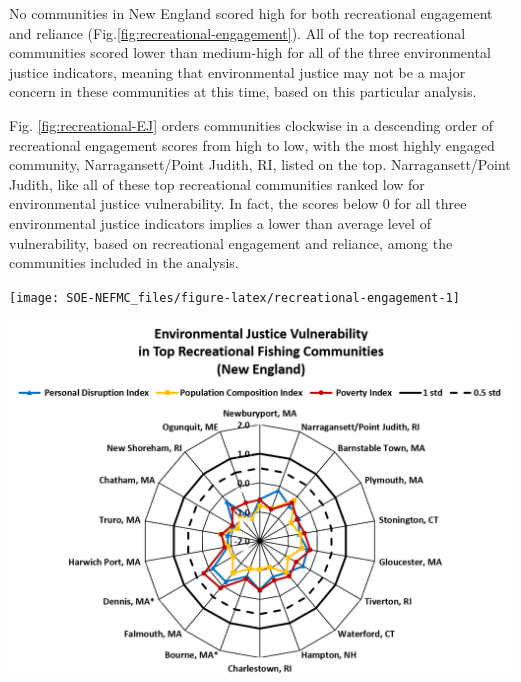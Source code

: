 \documentclass[
  10pt,
]{article}
\let\origfigure\figure
\let\endorigfigure\endfigure
\renewenvironment{figure}[1][2] {
    \expandafter\origfigure\expandafter[H]
} {
    \endorigfigure
}
\begin{document}
No communities in New England scored high for both recreational engagement and reliance (Fig.\ref{fig:recreational-engagement}). All of the top recreational communities scored lower than medium-high for all of the three environmental justice indicators, meaning that environmental justice may not be a major concern in these communities at this time, based on this particular analysis.

Fig. \ref{fig:recreational-EJ} orders communities clockwise in a descending order of recreational engagement scores from high to low, with the most highly engaged community, Narragansett/Point Judith, RI, listed on the top. Narragansett/Point Judith, like all of these top recreational communities ranked low for environmental justice vulnerability. In fact, the scores below 0 for all three environmental justice indicators implies a lower than average level of vulnerability, based on recreational engagement and reliance, among the communities included in the analysis.

\begin{figure}

{\centering \texttt{[image: SOE-NEFMC\_files/figure-latex/recreational-engagement-1]} 

}

\caption{Recreational engagement and reliance, and environmental justice vulnerability, for the top recreationally engaged and reliant fishing communities in New England. None of these communities ranked medium-high or above for one or more of the environmental justice indicators.}\label{fig:recreational-engagement}
\end{figure}

\begin{figure}

{\centering \includegraphics[width=0.75\linewidth]{SOE-NEFMC_files/figure-latex/recreational-EJ-1} 

}

\caption{Environmental justice indicators (Poverty Index, population composition index, and personal disruption index) for top recreational fishing communities in New England. *Community scored high (1.00 and above) for both commercial engagement and reliance indicators.}\label{fig:recreational-EJ}
\end{figure}
\end{document}

